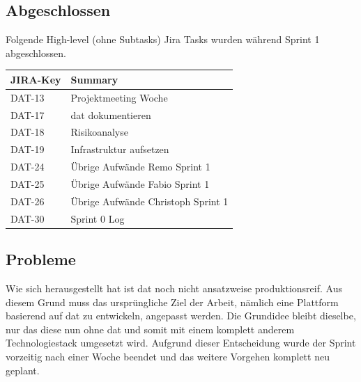 \subsection*{Abgeschlossen}
Folgende High-level (ohne Subtasks) Jira Tasks wurden während Sprint 1 abgeschlossen.

\begin{table}[H]
\centering
\begin{tabular}{ll}
	\toprule
	\textbf{JIRA-Key} & \textbf{Summary}\\
	\midrule
	DAT-13 & Projektmeeting Woche \\
	DAT-17 & dat dokumentieren \\
	DAT-18 & Risikoanalyse \\
	DAT-19 & Infrastruktur aufsetzen \\
	DAT-24 & Übrige Aufwände Remo Sprint 1 \\
	DAT-25 & Übrige Aufwände Fabio Sprint 1 \\
	DAT-26 & Übrige Aufwände Christoph Sprint 1 \\
	DAT-30 & Sprint 0 Log\\
	\bottomrule
\end{tabular}	
\end{table}

\subsection*{Probleme}\label{sec:pm:sprint1-probleme}
Wie sich herausgestellt hat ist \gls{dat} noch nicht ansatzweise produktionsreif. Aus diesem Grund muss das ursprüngliche Ziel der Arbeit, nämlich eine Plattform basierend auf \gls{dat} zu entwickeln, angepasst werden. Die Grundidee bleibt dieselbe, nur das diese nun ohne \gls{dat} und somit mit einem komplett anderem Technologiestack umgesetzt wird. Aufgrund dieser Entscheidung wurde der Sprint vorzeitig nach einer Woche beendet und das weitere Vorgehen komplett neu geplant.